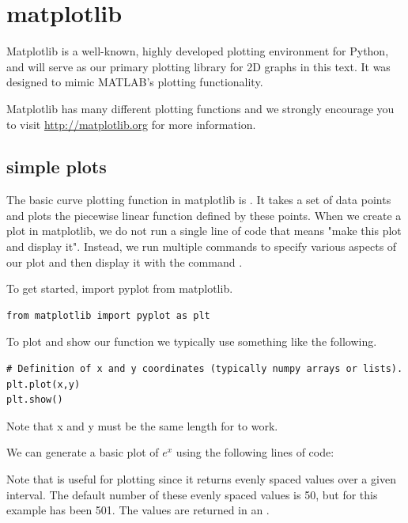  \label{lab:Matplotlib_and_Mayavi}

\section*{matplotlib}

Matplotlib is a well-known, highly developed plotting environment for Python, and will serve as our primary plotting library for 2D graphs in this text. It was designed to mimic MATLAB's plotting functionality.

Matplotlib has many different plotting functions and we strongly
encourage you to visit \url{http://matplotlib.org} for more
information.

\subsection*{simple plots} 

The basic curve plotting function in matplotlib is . It takes a
set of data points and plots the piecewise linear function defined by these points.
When we create a plot in matplotlib, we do not run a single line of code that means "make this plot and display it". Instead, we run multiple commands to specify various aspects of our plot and then display it with the command .

To get started, import pyplot from matplotlib.
\begin{lstlisting} 
from matplotlib import pyplot as plt
\end{lstlisting}

To plot and show our function we typically use something like the following.
\begin{lstlisting} 
# Definition of x and y coordinates (typically numpy arrays or lists).
plt.plot(x,y) 
plt.show() 
\end{lstlisting}

Note that x and y must be the same length for  to work. 

We can generate a basic plot of $e^x$ using the following lines of code:



Note that  is useful for plotting since it returns evenly spaced values over a given interval. The default number of these evenly spaced values is 50, but for this example has been 501. The values are returned in an . 

